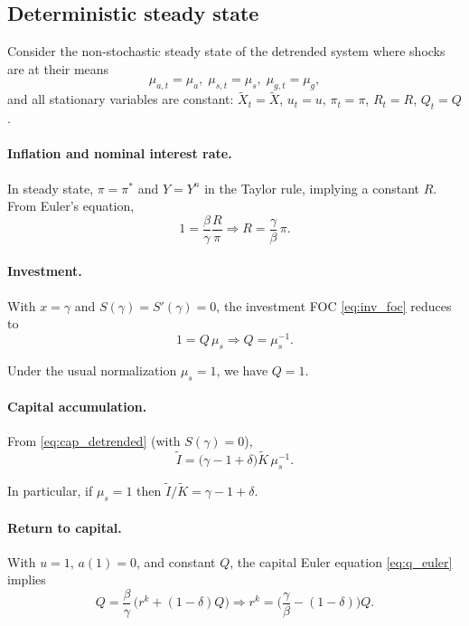 \subsection{Deterministic steady state}
\label{app:ss}

Consider the non-stochastic steady state of the detrended system where shocks are at their means
\begin{equation}
	\mu_{a,t}=\mu_a,\; \mu_{s,t}=\mu_s,\; \mu_{g,t}=\mu_g,
\end{equation}
and all stationary variables are constant: $\tilde X_t=\tilde X$, $u_t=u$, $\pi_t=\pi$, $R_t=R$, $Q_t=Q$.

\paragraph{Inflation and nominal interest rate.}
In steady state, $\pi=\pi^*$ and $Y=Y^n$ in the Taylor rule, implying a constant $R$. From Euler's equation,
\begin{equation}
	1 = \frac{\beta}{\gamma}\frac{R}{\pi}
	\Longrightarrow
	R = \frac{\gamma}{\beta}\,\pi.
\end{equation}

\paragraph{Investment.}
With $x=\gamma$ and $S(\gamma)=S'(\gamma)=0$, the investment FOC \eqref{eq:inv_foc} reduces to
\begin{equation}
	1 = Q\,\mu_s \Longrightarrow Q = \mu_s^{-1}.
\end{equation}

Under the usual normalization $\mu_s=1$, we have $Q=1$.

\paragraph{Capital accumulation.}
From \eqref{eq:cap_detrended} (with $S(\gamma)=0$),
\begin{equation}
	\tilde I = \big(\gamma-1+\delta\big)\tilde K\,\mu_s^{-1}.
\end{equation}

In particular, if $\mu_s=1$ then $\tilde I/\tilde K = \gamma-1+\delta$.

\paragraph{Return to capital.}
With $u=1$, $a(1)=0$, and constant $Q$, the capital Euler equation \eqref{eq:q_euler} implies
\begin{equation}
	Q = \frac{\beta}{\gamma}\,\big(r^k + (1-\delta)Q\big)
	\Longrightarrow
	r^k = \Big(\frac{\gamma}{\beta}-(1-\delta)\Big)Q.
\end{equation}

